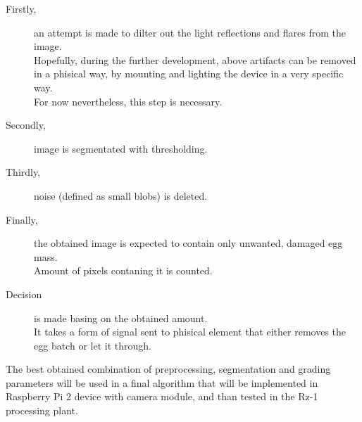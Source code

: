 \documentclass[12pt,twoside,a4paper]{article}
\begin{document}
\begin{description}
  \item[Firstly,]an attempt is made to dilter out the light reflections and flares from the image.\\
  Hopefully, during the further development, above artifacts can be removed in a phisical way, by mounting and lighting the device in a very specific way.\\
  For now nevertheless, this step is necessary.\\
  \item[Secondly,]image is segmentated with thresholding.
  \item[Thirdly,]noise (defined as small blobs) is deleted.
  \item[Finally,]the obtained image is expected to contain only unwanted, damaged egg mass.\\
  Amount of pixels contaning it is counted.
  \item[Decision] is made basing on the obtained amount.\\
  It takes a form of signal sent to phisical element that either removes the egg batch or let it through.
\end{description}

The best obtained combination of preprocessing, segmentation and grading parameters will be used in a final algorithm that will be implemented in Raspberry Pi 2 device with camera module, and than tested in the Rz-1 processing plant.
\end{document}
